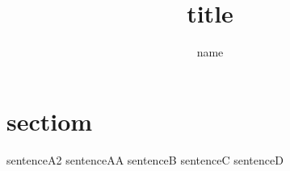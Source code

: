 \documentclass{jarticle}
\title{title}
\author{name}
\begin{document}
\maketitle
\section{sectiom}
sentenceA2
sentenceAA
sentenceB
sentenceC
sentenceD
\end{document}

